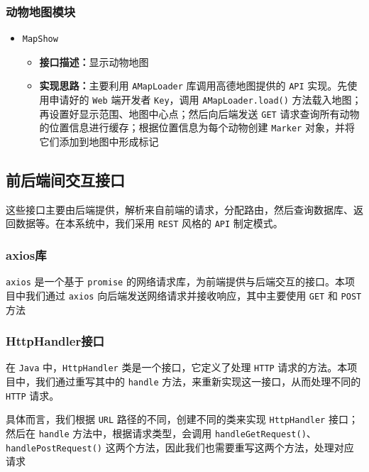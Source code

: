 \documentclass[12pt,a4paper,UTF8]{article}
\begin{document}
\subsubsection{动物地图模块}

\begin{itemize}

  \item \verb|MapShow|
  \begin{itemize}
  \item \textbf{接口描述：}显示动物地图
  \item \textbf{实现思路：}主要利用  \verb|AMapLoader| 库调用高德地图提供的 \verb|API| 实现。先使用申请好的 \verb|Web| 端开发者 \verb|Key|，调用  \verb|AMapLoader.load()| 方法载入地图；再设置好显示范围、地图中心点；然后向后端发送 \verb|GET| 请求查询所有动物的位置信息进行缓存；根据位置信息为每个动物创建 \verb|Marker| 对象，并将它们添加到地图中形成标记
  \end{itemize}

\end{itemize}

\subsection{前后端间交互接口}

这些接口主要由后端提供，解析来自前端的请求，分配路由，然后查询数据库、返回数据等。在本系统中，我们采用 \verb|REST| 风格的 \verb|API| 制定模式。

\subsubsection{axios库}

\verb|axios| 是一个基于 \verb|promise| 的网络请求库，为前端提供与后端交互的接口。本项目中我们通过 \verb|axios| 向后端发送网络请求并接收响应，其中主要使用 \verb|GET| 和 \verb|POST| 方法

\subsubsection{HttpHandler接口}

在 \verb|Java| 中，\verb|HttpHandler| 类是一个接口，它定义了处理 \verb|HTTP| 请求的方法。本项目中，我们通过重写其中的 \verb|handle| 方法，来重新实现这一接口，从而处理不同的 \verb|HTTP| 请求。

具体而言，我们根据 \verb|URL| 路径的不同，创建不同的类来实现 \verb|HttpHandler| 接口；然后在 \verb|handle| 方法中，根据请求类型，会调用 \verb|handleGetRequest()|、\verb|handlePostRequest()| 这两个方法，因此我们也需要重写这两个方法，处理对应请求
\end{document}
